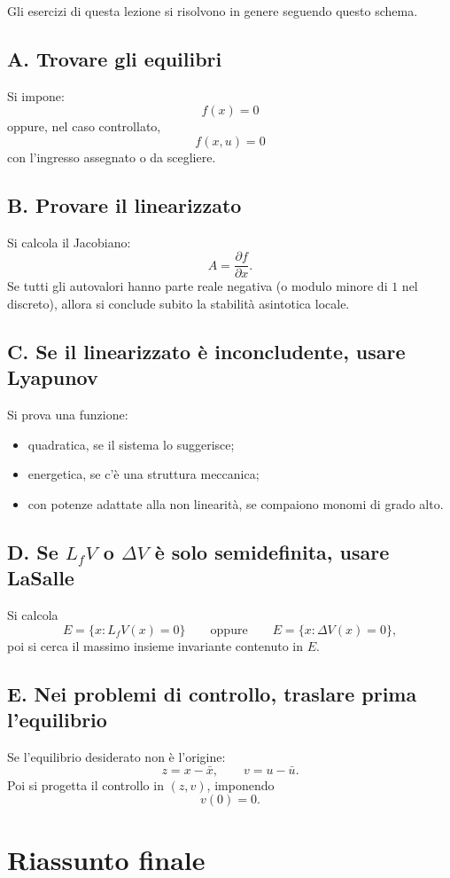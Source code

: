 Gli esercizi di questa lezione si risolvono in genere seguendo questo schema.

\subsection*{A. Trovare gli equilibri}
Si impone:
\[
f(x)=0
\]
oppure, nel caso controllato,
\[
f(x,u)=0
\]
con l'ingresso assegnato o da scegliere.

\subsection*{B. Provare il linearizzato}
Si calcola il Jacobiano:
\[
A=\frac{\partial f}{\partial x}.
\]
Se tutti gli autovalori hanno parte reale negativa (o modulo minore di \(1\) nel discreto), allora si conclude subito la stabilità asintotica locale.

\subsection*{C. Se il linearizzato è inconcludente, usare Lyapunov}
Si prova una funzione:
\begin{itemize}
    \item quadratica, se il sistema lo suggerisce;
    \item energetica, se c'è una struttura meccanica;
    \item con potenze adattate alla non linearità, se compaiono monomi di grado alto.
\end{itemize}

\subsection*{D. Se \(L_fV\) o \(\Delta V\) è solo semidefinita, usare LaSalle}
Si calcola
\[
E=\{x:L_fV(x)=0\}
\qquad \text{oppure} \qquad
E=\{x:\Delta V(x)=0\},
\]
poi si cerca il massimo insieme invariante contenuto in \(E\).

\subsection*{E. Nei problemi di controllo, traslare prima l'equilibrio}
Se l'equilibrio desiderato non è l'origine:
\[
z=x-\bar x,\qquad v=u-\bar u.
\]
Poi si progetta il controllo in \((z,v)\), imponendo
\[
v(0)=0.
\]

\section{Riassunto finale}

